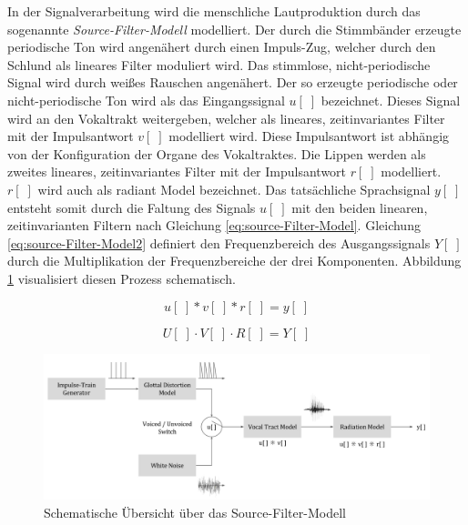 In der Signalverarbeitung wird die menschliche Lautproduktion durch das sogenannte \emph{Source-Filter-Modell} modelliert. Der durch die Stimmbänder erzeugte periodische Ton wird angenähert durch einen Impuls-Zug, welcher durch den Schlund als lineares Filter moduliert wird. Das stimmlose, nicht-periodische Signal wird durch weißes Rauschen angenähert. Der so erzeugte periodische oder nicht-periodische Ton wird als das Eingangssignal $u[\;]$ bezeichnet. Dieses Signal wird an den Vokaltrakt weitergeben, welcher als lineares, zeitinvariantes Filter mit der Impulsantwort $v[\;]$ modelliert wird. Diese Impulsantwort ist abhängig von der Konfiguration der Organe des Vokaltraktes. Die Lippen werden als zweites lineares, zeitinvariantes Filter mit der Impulsantwort $r[\;]$ modelliert. $r[\;]$ wird auch als \glqq radiant Model\grqq{} bezeichnet. Das tatsächliche Sprachsignal $y[\;]$ entsteht somit durch die Faltung des Signals $u[\;]$ mit den beiden linearen, zeitinvarianten Filtern nach Gleichung \ref{eq:source-Filter-Model}. Gleichung \ref{eq:source-Filter-Model2} definiert den Frequenzbereich des Ausgangssignals $Y[\;]$ durch die Multiplikation der Frequenzbereiche der drei Komponenten. Abbildung \ref{img:source-filter-model} visualisiert diesen Prozess schematisch.\cite[S. 62 - 63]{cryModel} \cite{speechProduction}

\begin{equation}
u[\;] * v[\;] * r[\;] = y[\;] 
\label{eq:source-Filter-Model}
\end{equation}

\begin{equation}
U[\;] \cdot V[\;] \cdot R[\;] = Y[\;] 
\label{eq:source-Filter-Model2}
\end{equation}

\begin{figure}[H]
	\centering
	\includegraphics[width=1\textwidth]{bilder/source-filter-model.png}
	\caption[Schematische Übersicht über das Source-Filter-Modell]{Schematische Übersicht über das Source-Filter-Modell\cite[nach \emph{Source estimation}, S. 17]{ricardo_ceps}}
	\label{img:source-filter-model}
\end{figure}	

